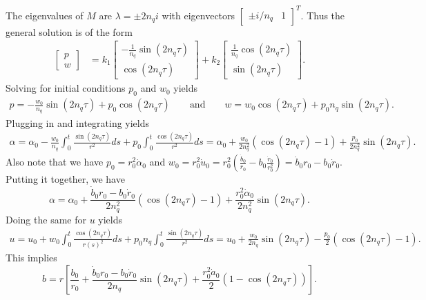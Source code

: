 \documentclass[11pt]{article}
\begin{document}
The eigenvalues of $M$ are $\lambda = \pm 2n_qi$ with eigenvectors $\begin{bmatrix}
    \pm i/n_q & 1
\end{bmatrix}^T$. Thus the general solution is of the form 
\begin{align*}
    \begin{bmatrix}
        p \\ w
    \end{bmatrix} &= k_1\begin{bmatrix}
        -\frac{1}{n_q}\sin(2n_q\tau) \\ \cos(2n_q\tau)
    \end{bmatrix} + k_2\begin{bmatrix}
        \frac{1}{n_q}\cos(2n_q\tau) \\ \sin(2n_q\tau)
    \end{bmatrix}.
\end{align*}
Solving for initial conditions $p_0$ and $w_0$ yields
\begin{align*}
    p = -\frac{w_0}{n_q}\sin(2n_q\tau) + p_0\cos(2n_q\tau) \qquad \text{and} \qquad w = w_0\cos(2n_q\tau) + p_0n_q\sin(2n_q\tau).
\end{align*}
Plugging in and integrating yields
\begin{align*}
    \alpha = \alpha_0 -\frac{w_0}{n_q} \int_0^t\frac{\sin(2n_q\tau)}{r^2}ds + p_0 \int_0^t \frac{\cos(2n_q\tau)}{r^2} ds = \alpha_0 + \frac{w_0}{2n_q^2}(\cos(2n_q\tau) - 1) + \frac{p_0}{2n_q^2}\sin(2n_q\tau).
\end{align*}
Also note that we have $p_0 = r_0^2\dot \alpha_0$ and $w_0 = r_0^2\dot u_0 = r_0^2 (\frac{\dot b_0}{r_0} - b_0\frac{\dot r_0}{r_0^2}) = \dot b_0r_0 - b_0\dot r_0.$ Putting it together, we have
\begin{equation*}
    \alpha = \alpha_0 + \frac{\dot b_0r_0 - b_0\dot r_0}{2n_q^2}(\cos(2n_q\tau)-1) + \frac{r_0^2\dot \alpha_0}{2n_q^2}\sin(2n_q\tau).
\end{equation*}
Doing the same for $u$ yields
\begin{align*}
    u = u_0 + w_0 \int_0^t\frac{\cos(2n_q\tau)}{r(s)^2}ds + p_0 n_q \int_0^t \frac{\sin(2n_q\tau)}{r^2} ds = u_0 + \frac{w_0}{2n_q}\sin(2n_q\tau) - \frac{p_0}{2} (\cos(2n_q\tau)-1).
\end{align*}
This implies
\begin{equation*}
    b = r\left[\frac{b_0}{r_0} + \frac{\dot b_0r_0 - b_0\dot r_0}{2n_q}\sin(2n_q\tau) + \frac{r_0^2\dot a_0}{2} (1- \cos(2n_q\tau))\right].
\end{equation*}
\end{document}
